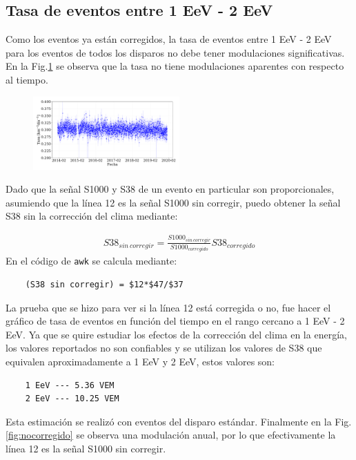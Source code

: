 \subsection{Tasa de eventos entre 1 EeV - 2 EeV}

Como los eventos ya están corregidos, la tasa de eventos entre  1 EeV - 2 EeV para los eventos de todos los disparos no debe tener modulaciones significativas. En la Fig.\ref{fig:corregido} se observa que la tasa no tiene modulaciones  aparentes con respecto al tiempo.

\begin{figure}[H]
    \begin{small}
        \begin{center}
            \includegraphics[width=0.5\textwidth]{tasa_eventos_corregido.pdf}
        \end{center}
        \caption{}
        \label{fig:corregido}
    \end{small}
\end{figure}

Dado que la señal S1000 y S38 de un evento en particular son proporcionales, asumiendo que la línea 12 es la señal S1000 sin corregir, puedo obtener la señal S38 sin la corrección del clima mediante:

\begin{align}
    S38_{sin\,corregir} = \frac{S1000_{sin\,corregir}}{S1000_{corregido}} S38_{corregido}
\end{align}
En el código de \verb|awk| se calcula mediante:
\begin{verbatim}
    (S38 sin corregir) = $12*$47/$37
\end{verbatim}

La prueba que se hizo para ver si la línea 12 está corregida o no, fue hacer el gráfico de tasa de eventos en función del tiempo en el rango cercano a 1 EeV -  2 EeV. Ya que se quire estudiar los efectos de la corrección del clima en la energía, los valores reportados no son confiables y se utilizan los valores de S38 que equivalen aproximadamente a  1 EeV y 2 EeV, estos valores son:
\begin{verbatim}
    1 EeV --- 5.36 VEM
    2 EeV --- 10.25 VEM
\end{verbatim}
Esta estimación se realizó con eventos del disparo estándar. Finalmente en la Fig.\ref{fig:nocorregido} se observa  una modulación anual, por lo que efectivamente la línea 12 es la señal S1000 sin corregir.


